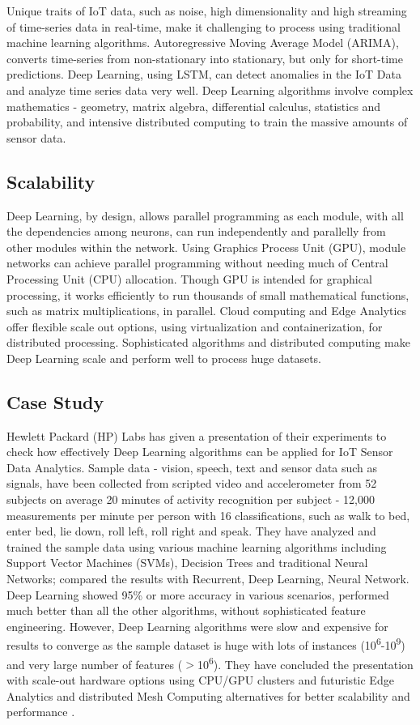 \documentclass[sigconf]{acmart}
\begin{document}
	Unique traits of IoT data, such as noise, high dimensionality and high streaming of time-series data in real-time, make it challenging to process using traditional machine learning algorithms. Autoregressive Moving Average Model (ARIMA), converts time-series from non-stationary into stationary, but only for short-time predictions. Deep Learning, using LSTM, can detect anomalies in the IoT Data and analyze time series data very well. Deep Learning algorithms involve complex mathematics - geometry, matrix algebra, differential calculus, statistics and probability, and intensive distributed computing to train the massive amounts of sensor data.
	
	\subsection{Scalability}
	
	Deep Learning, by design, allows parallel programming as each module, with all the dependencies among neurons, can run independently and parallelly from other modules within the network. Using Graphics Process Unit (GPU), module networks can achieve parallel programming without needing much of Central Processing Unit (CPU) allocation. Though GPU is intended for graphical processing, it works efficiently to run thousands of small mathematical functions, such as matrix multiplications, in parallel. Cloud computing and Edge Analytics offer flexible scale out options, using virtualization and containerization, for distributed processing. Sophisticated algorithms and distributed computing make Deep Learning scale and perform well to process huge datasets. 
	
	\subsection{Case Study}
	
	Hewlett Packard (HP) Labs has given a presentation of their experiments to check how effectively Deep Learning algorithms can be applied for IoT Sensor Data Analytics. Sample data - vision, speech, text and sensor data such as signals, have been collected from scripted video and accelerometer from 52 subjects on average 20 minutes of activity recognition per subject - 12,000 measurements per minute per person with 16 classifications, such as walk to bed, enter bed, lie down, roll left, roll right and speak. They have analyzed and trained the sample data using various machine learning algorithms including Support Vector Machines (SVMs), Decision Trees and traditional Neural Networks; compared the results with Recurrent, Deep Learning, Neural Network. Deep Learning showed 95\% or more accuracy in various scenarios, performed much better than all the other algorithms, without sophisticated feature engineering. However, Deep Learning algorithms were slow and expensive for results to converge as the sample dataset is huge with lots of instances (10\textsuperscript{6}-10\textsuperscript{9}) and very large number of features ($>$10\textsuperscript{6}). They have concluded the presentation with scale-out hardware options using CPU/GPU clusters and futuristic Edge Analytics and distributed Mesh Computing alternatives for better scalability and performance \cite{hp}. 
			
\end{document}
